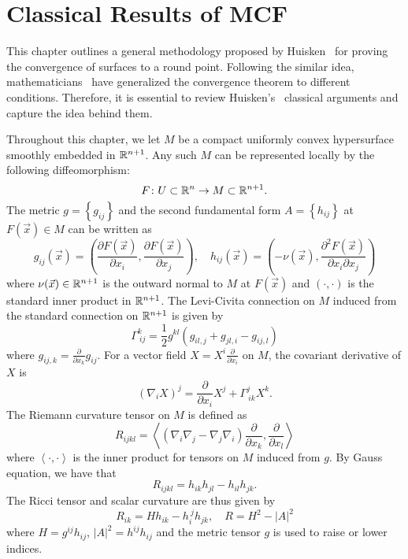 %

\chapter{Classical Results of MCF} \label{chap:crmcf}

This chapter outlines a general methodology proposed by Huisken~\cite{huisken_flow_1984} for proving the convergence of surfaces to a round point. Following the similar idea, mathematicians~\cite{andrews_mean_2010,liu2012mean,hirsch2020contracting} have generalized the convergence theorem to different conditions. Therefore, it is essential to review Huisken's~\cite{huisken_flow_1984} classical arguments and capture the idea behind them.

Throughout this chapter, we let $M$ be a compact uniformly convex hypersurface smoothly embedded in $\mathbb{R}^{n+1}$. Any such $M$ can be represented locally by the following diffeomorphism:
\[
	F\colon U \subset \mathbb{R}^n \rightarrow M \subset \mathbb{R}^{n+1}.
\]
The metric $g= \left\{ g_{ij} \right\}  $ and the second fundamental form $A= \left\{ h_{ij} \right\}  $ at $F(\vec{x}) \in M$ can be written as
\[
	g_{ij}(\vec{x})=\left( \frac{\partial F(\vec{x})}{\partial x_i}, \frac{\partial F(\vec{x})}{\partial x_j} \right) ,\quad h_{ij}(\vec{x})=\left( -\nu (\vec{x}), \frac{\partial^2 F(\vec{x})}{\partial x_i \partial x_j} \right)
\]
where $\nu (\vec{x}) \in \mathbb{R}^{n+1}$ is the outward normal to $M$ at $F(\vec{x})$ and $\left( \cdot , \cdot \right) $ is the standard inner product in $\mathbb{R}^{n+1}$. The Levi-Civita connection on $M$ induced from the standard connection on $\mathbb{R}^{n+1}$ is given by 
\[\Gamma_{\ ij}^{k} =\frac{1}{2}g_{ }^{kl} \left( g_{ il,j}^{} +g_{ jl,i}^{} - g_{ij ,l}^{}  \right) \]
where $g_{ij ,k}=\frac{\partial }{\partial x_{k}} g_{ij}$. For a vector field $X=X^i \frac{\partial }{\partial x_{i}} $ on $M$, the covariant derivative of $X$ is \[\left( \nabla_{i}^{} X \right) ^j=\frac{\partial }{\partial x_{i}} X^j + \Gamma_{\ ik}^{j} X^k.\]
The Riemann curvature tensor on $M$ is defined as 
\[R_{ijkl}= \left< (\nabla_{i}^{} \nabla_{j}^{} -\nabla_{j}^{} \nabla_{i}^{}) \frac{\partial }{\partial x_{k}} , \frac{\partial }{\partial x_{l}}  \right> \] where $\left\langle  \cdot , \cdot \right\rangle $ is the inner product for tensors on $M$ induced from $g$. By Gauss equation, we have that 
\begin{equation} \label{eq:gauss}
	R_{ijkl}=h_{ik}h_{jl }^{}-h_{ il}^{} h_{ jk}^{} .
\end{equation}
The Ricci tensor and scalar curvature are thus given by
\[R_{ik}=Hh_{ik}-h_{ i}^{\ j} h_{ jk}^{} , \quad R=H^2-\left| A \right| ^2\]
where $H=g^{ij}h_{ij}$, $\left| A \right| ^2=h^{ij}h_{ij}$ and the metric tensor $g$ is used to raise or lower indices.


